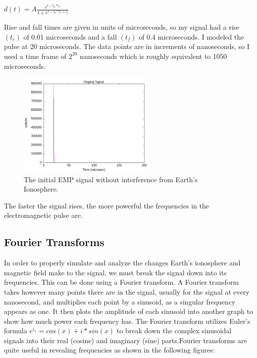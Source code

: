 \documentclass[12pt, reqno]{amsart}
\begin{document}
\begin{center}
    $d(t)=A\frac{e^{t-t_0*t_r}}{1 + e^{t-t_0*t_r + t_f}}$
\end{center}

\noindent Rise and fall times are given in units of microseconds, so my signal had a rise $(t_r)$ of 0.01 microseconds and a fall $(t_f)$ of 0.4 microseconds. I modeled the pulse at 20 microseconds. The data points are in increments of nanoseconds, so I used a time frame of $2^{20}$ nanoseconds
which is roughly equivalent to 1050 microseconds.

\begin{figure}[h]
    \centering
    \includegraphics[width= 0.6\textwidth]{emp_original_signal.png}
    \caption{\small The initial EMP signal without interference from Earth's Ionosphere.}
    \label{fig:test-08}
\end{figure}

The faster the signal rises, the more powerful the frequencies in the electromagnetic pulse are.

\subsection{Fourier Transforms}
In order to properly simulate and analyze the changes Earth's ionosphere and magnetic field make to the signal, we must break the signal down into its frequencies. This can be done using a Fourier transform. A Fourier transform takes however many points there are in the signal, usually for the signal at every nanosecond, and multiplies each point by a sinusoid, as a singular frequency appears as one. It then plots the amplitude of each sinusoid into another graph to show how much power each frequency has. The Fourier transform utilizes Euler's formula $e^{i_x} = cos(x) + i*sin(x)$
to break down the complex sinusoidal signals into their real (cosine) and imaginary (sine) parts.Fourier transforms are quite useful in revealing frequencies as shown in the following figures:
\end{document}
